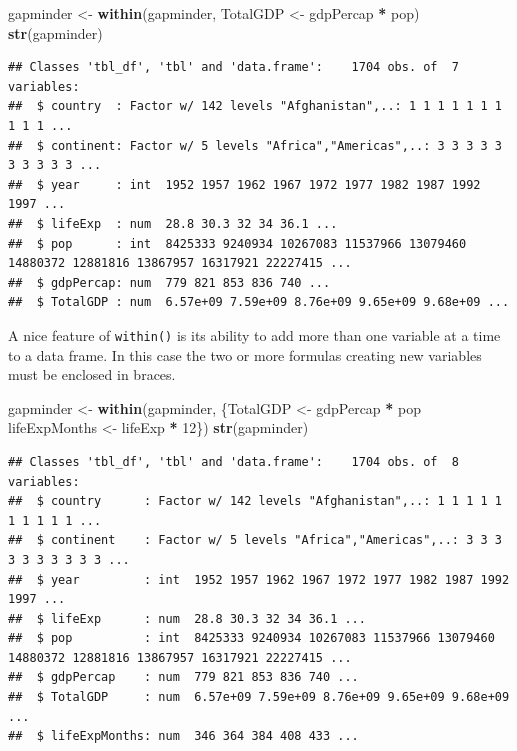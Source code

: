 \documentclass[]{article}
\newenvironment{Shaded}{\begin{snugshade}}{\end{snugshade}}
\newcommand{\KeywordTok}[1]{\textcolor[rgb]{0.13,0.29,0.53}{\textbf{#1}}}
\newcommand{\DecValTok}[1]{\textcolor[rgb]{0.00,0.00,0.81}{#1}}
\newcommand{\StringTok}[1]{\textcolor[rgb]{0.31,0.60,0.02}{#1}}
\newcommand{\OperatorTok}[1]{\textcolor[rgb]{0.81,0.36,0.00}{\textbf{#1}}}
\newcommand{\NormalTok}[1]{#1}
\begin{document}
\begin{Shaded}
\begin{Highlighting}[]
\NormalTok{gapminder <-}\StringTok{ }\KeywordTok{within}\NormalTok{(gapminder, TotalGDP <-}\StringTok{ }\NormalTok{gdpPercap }\OperatorTok{*}\StringTok{ }\NormalTok{pop)}
\KeywordTok{str}\NormalTok{(gapminder)}
\end{Highlighting}
\end{Shaded}

\begin{verbatim}
## Classes 'tbl_df', 'tbl' and 'data.frame':    1704 obs. of  7 variables:
##  $ country  : Factor w/ 142 levels "Afghanistan",..: 1 1 1 1 1 1 1 1 1 1 ...
##  $ continent: Factor w/ 5 levels "Africa","Americas",..: 3 3 3 3 3 3 3 3 3 3 ...
##  $ year     : int  1952 1957 1962 1967 1972 1977 1982 1987 1992 1997 ...
##  $ lifeExp  : num  28.8 30.3 32 34 36.1 ...
##  $ pop      : int  8425333 9240934 10267083 11537966 13079460 14880372 12881816 13867957 16317921 22227415 ...
##  $ gdpPercap: num  779 821 853 836 740 ...
##  $ TotalGDP : num  6.57e+09 7.59e+09 8.76e+09 9.65e+09 9.68e+09 ...
\end{verbatim}

A nice feature of \texttt{within()} is its ability to add more than one
variable at a time to a data frame. In this case the two or more
formulas creating new variables must be enclosed in braces.

\begin{Shaded}
\begin{Highlighting}[]
\NormalTok{gapminder <-}\StringTok{ }\KeywordTok{within}\NormalTok{(gapminder, \{TotalGDP <-}\StringTok{ }\NormalTok{gdpPercap }\OperatorTok{*}\StringTok{ }\NormalTok{pop }
\NormalTok{lifeExpMonths <-}\StringTok{ }\NormalTok{lifeExp }\OperatorTok{*}\StringTok{ }\DecValTok{12}\NormalTok{\})}
\KeywordTok{str}\NormalTok{(gapminder)}
\end{Highlighting}
\end{Shaded}

\begin{verbatim}
## Classes 'tbl_df', 'tbl' and 'data.frame':    1704 obs. of  8 variables:
##  $ country      : Factor w/ 142 levels "Afghanistan",..: 1 1 1 1 1 1 1 1 1 1 ...
##  $ continent    : Factor w/ 5 levels "Africa","Americas",..: 3 3 3 3 3 3 3 3 3 3 ...
##  $ year         : int  1952 1957 1962 1967 1972 1977 1982 1987 1992 1997 ...
##  $ lifeExp      : num  28.8 30.3 32 34 36.1 ...
##  $ pop          : int  8425333 9240934 10267083 11537966 13079460 14880372 12881816 13867957 16317921 22227415 ...
##  $ gdpPercap    : num  779 821 853 836 740 ...
##  $ TotalGDP     : num  6.57e+09 7.59e+09 8.76e+09 9.65e+09 9.68e+09 ...
##  $ lifeExpMonths: num  346 364 384 408 433 ...
\end{verbatim}
\end{document}
